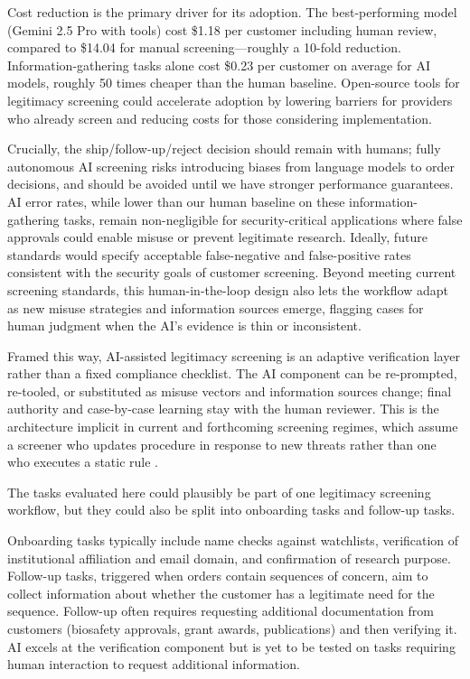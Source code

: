 \documentclass[12pt]{article}
\begin{document}
Cost reduction is the primary driver for its adoption. The best-performing model (Gemini 2.5 Pro with tools) cost \$1.18 per customer including human review, compared to \$14.04 for manual screening—roughly a 10-fold reduction. Information-gathering tasks alone cost \$0.23 per customer on average for AI models, roughly 50 times cheaper than the human baseline. Open-source tools for legitimacy screening \citep{Cliver2025} could accelerate adoption by lowering barriers for providers who already screen and reducing costs for those considering implementation.

Crucially, the ship/follow-up/reject decision should remain with humans; fully autonomous AI screening risks introducing biases from language models to order decisions, and should be avoided until we have stronger performance guarantees. AI error rates, while lower than our human baseline on these information-gathering tasks, remain non-negligible for security-critical applications where false approvals could enable misuse or prevent legitimate research. Ideally, future standards would specify acceptable false-negative and false-positive rates consistent with the security goals of customer screening. Beyond meeting current screening standards, this human-in-the-loop design also lets the workflow adapt as new misuse strategies and information sources emerge, flagging cases for human judgment when the AI's evidence is thin or inconsistent.

Framed this way, AI-assisted legitimacy screening is an adaptive verification layer rather than a fixed compliance checklist. The AI component can be re-prompted, re-tooled, or substituted as misuse vectors and information sources change; final authority and case-by-case learning stay with the human reviewer. This is the architecture implicit in current and forthcoming screening regimes, which assume a screener who updates procedure in response to new threats rather than one who executes a static rule \citep{Wheeler2024, EUBiotechAct2025}.

The tasks evaluated here could plausibly be part of one legitimacy screening workflow, but they could also be split into onboarding tasks and follow-up tasks.

Onboarding tasks typically include name checks against watchlists, verification of institutional affiliation and email domain, and confirmation of research purpose. Follow-up tasks, triggered when orders contain sequences of concern, aim to collect information about whether the customer has a legitimate need for the sequence. Follow-up often requires requesting additional documentation from customers (biosafety approvals, grant awards, publications) and then verifying it. AI excels at the verification component but is yet to be tested on tasks requiring human interaction to request additional information.
\end{document}
